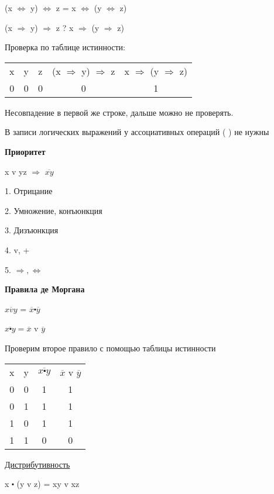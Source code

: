 \documentclass{article}
\begin{document}
(x $\Leftrightarrow$ y) $\Leftrightarrow$ z = x $\Leftrightarrow$ (y $\Leftrightarrow$ z) 

(x $\Rightarrow$ y) $\Rightarrow$ z ? x $\Rightarrow$ (y $\Rightarrow$ z)

Проверка по таблице истинности:

\begin{center}
\begin{tabular}{ |c|c|c|c|c| } 
 \hline
 x & y & z & (x $\Rightarrow$ y) $\Rightarrow$ z & x $\Rightarrow$ (y $\Rightarrow$ z)  \\ 
 0 & 0 & 0 & 0 & 1 \\
 \hline
\end{tabular}
\end{center}

Несовпадение в первой же строке, дальше можно не проверять.

В записи логических выражений у ассоциативных операций ( ) не нужны

\textbf{Приоритет}

x v yz $\Rightarrow$ $\overline{xy}$

1. Отрицание

2. Умножение, конъюнкция

3. Дизъюнкция

4. v, +

5. $\Rightarrow , \Leftrightarrow$

\textbf{Правила де Моргана }

$\overline{x v y}$ = $\overline{x} \centerdot \overline{y}$

$\overline{x \centerdot y} = \overline{x}$ v $\overline{y}$ 

Проверим второе правило с помощью таблицы истинности

\begin{center}
\begin{tabular}{ |c|c|c|c| } 
 \hline
 x & y & $\overline{x \centerdot y}$ & $\overline{x}$ v $\overline{y}$  \\ 
 0 & 0 & 1 & 1 \\
 0 & 1 & 1 & 1 \\
 1 & 0 & 1 & 1 \\
 1 & 1 & 0 & 0 \\
 \hline
\end{tabular}
\end{center}

 \underline{Дистрибутивность}
 
 x $\centerdot$ (y v z) = xy v xz
 
\end{document}
